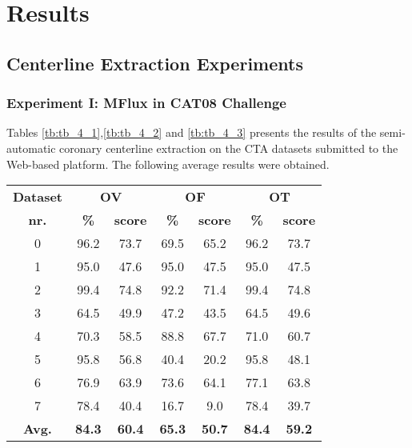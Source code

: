 \chapter{Results}\label{res:res}

\section{Centerline Extraction Experiments}

\subsection{Experiment I: MFlux in CAT08 Challenge}

Tables \ref{tb:tb_4_1},\ref{tb:tb_4_2} and \ref{tb:tb_4_3}  presents the results of the semi-automatic coronary centerline extraction on the CTA datasets submitted to the Web-based platform. The following average results were obtained. 

\begin{table*}[h]
\scriptsize
\caption{MFlux average overlap per dataset}
\centering
\begin{tabular}{|c|cc|cc|cc|}
\hline
\multicolumn{1}{|c|}{\textbf{Dataset}} &\multicolumn{2}{c|}{\textbf{OV}} &\multicolumn{2}{c|}{\textbf{OF}} &\multicolumn{2}{c|}{\textbf{OT}}\\
\multicolumn{1}{|c|}{\textbf{nr.}} &\multicolumn{1}{c|}{\textbf{\%}} &\multicolumn{1}{c|}{\textbf{score}} &\multicolumn{1}{c|}{\textbf{\%}} &\multicolumn{1}{c|}{\textbf{score}} &\multicolumn{1}{c|}{\textbf{\%}} &\multicolumn{1}{c|}{\textbf{score}}\\
\hline
0&96.2&73.7&69.5&65.2&96.2&73.7\\
1&95.0&47.6&95.0&47.5&95.0&47.5\\
2&99.4&74.8&92.2&71.4&99.4&74.8\\
3&64.5&49.9&47.2&43.5&64.5&49.6\\
4&70.3&58.5&88.8&67.7&71.0&60.7\\
5&95.8&56.8&40.4&20.2&95.8&48.1\\
6&76.9&63.9&73.6&64.1&77.1&63.8\\
7&78.4&40.4&16.7&9.0&78.4&39.7\\
\hline
\textbf{Avg.}&\textbf{84.3}&\textbf{60.4}&\textbf{65.3}&\textbf{50.7}&\textbf{84.4}&\textbf{59.2}\\
\hline
\end{tabular}
\vspace{-0.3cm}
\label{tb:tb_4_1}
\normalsize
\end{table*}

